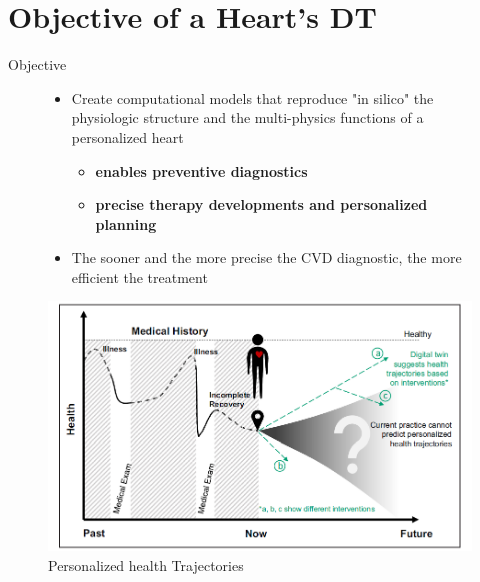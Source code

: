 \documentclass{beamer}
\begin{document}
\section{Objective of a Heart's DT}
\begin{frame}{Objective}
\begin{figure}
    \centering
    \begin{minipage}{0.5\linewidth}
      \begin{itemize}
        \item Create computational models that reproduce "in silico" the physiologic structure and the multi-physics functions of a personalized heart
        \begin{itemize}
            \item \textbf{enables preventive diagnostics}
            \item \textbf{precise therapy developments and personalized planning}
        \end{itemize}
        \item The sooner and the more precise the CVD diagnostic, the more efficient the treatment
      \end{itemize}
    \end{minipage}\hfill
    \begin{minipage}{0.45\linewidth}
        \centering
        \includegraphics[width=1\linewidth]{images/DT_perso_health_trajectories.png}
        \caption{Personalized health Trajectories \cite{sel2024digital}}
        \label{fig:traject_perso}
    \end{minipage}
\end{figure}
\end{frame}
\end{document}
